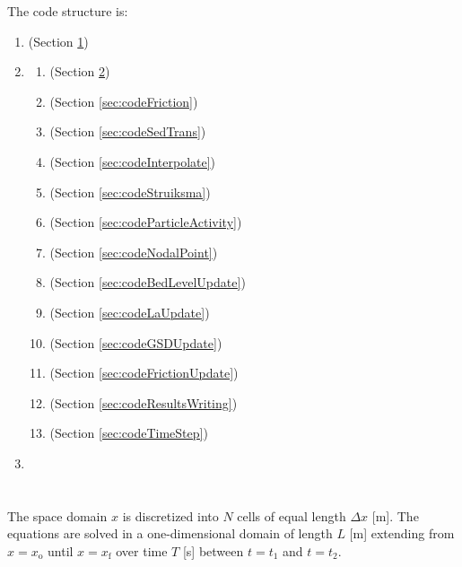 \documentclass{deltares_report_elv}
\newcommand{\mathsub}[2]{#1_{\mathrm{#2}}}
\begin{document}
The code structure is:
\begin{enumerate}[label*=\arabic*.]
\item \codeInit{} (Section \ref{sec:codeInit})
\item \codeTimeLoop{} 
\begin{enumerate}[label*=\arabic*.]
\item \codeFlowUpdate{} (Section \ref{sec:codeFlowUpdate})
\item \codeFriction{} (Section \ref{sec:codeFriction})
\item \codeSedTrans{} (Section \ref{sec:codeSedTrans})
\item \codeInterpolate{} (Section \ref{sec:codeInterpolate})
\item \codeStruiksma{} (Section \ref{sec:codeStruiksma})
\item \codeParticleActivity{} (Section \ref{sec:codeParticleActivity})
\item \codeNodalPoint{} (Section \ref{sec:codeNodalPoint})
\item \codeBedLevelUpdate{} (Section \ref{sec:codeBedLevelUpdate})
\item \codeLaUpdate{} (Section \ref{sec:codeLaUpdate})
\item \codeGSDUpdate{} (Section \ref{sec:codeGSDUpdate})
\item \codeFrictionUpdate{} (Section \ref{sec:codeFrictionUpdate})
\item \codeResultsWriting{} (Section \ref{sec:codeResultsWriting})
\item \codeTimeStep{} (Section \ref{sec:codeTimeStep})
\end{enumerate}
\item{\codeFinal{}}
\end{enumerate}

\section{\codeInit{}}
\label{sec:codeInit}

The space domain $x$ is discretized into $N$ cells of equal length $\Delta x$ [\si{m}]. The equations are solved in a one-dimensional domain of length $L$ [\si{m}] extending from $x=\mathsub{x}{o}$ until $x=\mathsub{x}{f}$ over time $T$ [\si{s}] between $t=\mathsub{t}{1}$ and $t=\mathsub{t}{2}$. 

\section{\codeFlowUpdate{}}
\label{sec:codeFlowUpdate}
\end{document}
